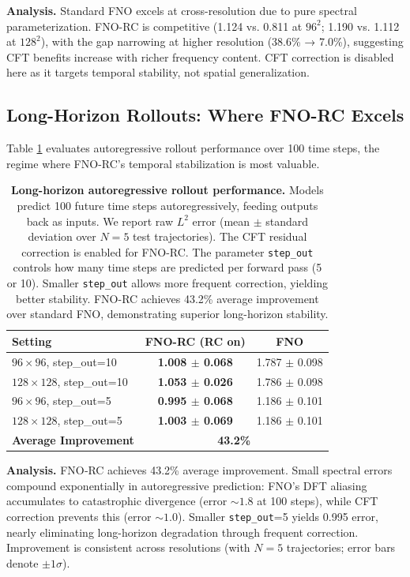 \documentclass[11pt]{article}
\begin{document}
\textbf{Analysis.} Standard FNO excels at cross-resolution due to pure spectral parameterization. FNO-RC is competitive (1.124 vs. 0.811 at $96^2$; 1.190 vs. 1.112 at $128^2$), with the gap narrowing at higher resolution (38.6\% → 7.0\%), suggesting CFT benefits increase with richer frequency content. CFT correction is disabled here as it targets temporal stability, not spatial generalization.

\subsection{Long-Horizon Rollouts: Where FNO-RC Excels}

Table \ref{tab:rollout} evaluates autoregressive rollout performance over 100 time steps, the regime where FNO-RC's temporal stabilization is most valuable.

\begin{table}[h]
\centering
\caption{\textbf{Long-horizon autoregressive rollout performance.} Models predict 100 future time steps autoregressively, feeding outputs back as inputs. We report raw $L^2$ error (mean $\pm$ standard deviation over $N=5$ test trajectories). The CFT residual correction is enabled for FNO-RC. The parameter \texttt{step\_out} controls how many time steps are predicted per forward pass (5 or 10). Smaller \texttt{step\_out} allows more frequent correction, yielding better stability. FNO-RC achieves 43.2\% average improvement over standard FNO, demonstrating superior long-horizon stability.}
\label{tab:rollout}
\small
\begin{tabular}{@{}lcc@{}}
\toprule
\textbf{Setting} & \textbf{FNO-RC (RC on)} & \textbf{FNO} \\
\midrule
$96 \times 96$, step\_out=10 & \textbf{1.008 $\pm$ 0.068} & 1.787 $\pm$ 0.098 \\
$128 \times 128$, step\_out=10 & \textbf{1.053 $\pm$ 0.026} & 1.786 $\pm$ 0.098 \\
$96 \times 96$, step\_out=5 & \textbf{0.995 $\pm$ 0.068} & 1.186 $\pm$ 0.101 \\
$128 \times 128$, step\_out=5 & \textbf{1.003 $\pm$ 0.069} & 1.186 $\pm$ 0.101 \\
\midrule
\textbf{Average Improvement} & \multicolumn{2}{c}{\textbf{43.2\%}} \\
\bottomrule
\end{tabular}
\end{table}

\textbf{Analysis.} FNO‑RC achieves 43.2\% average improvement. Small spectral errors compound exponentially in autoregressive prediction: FNO's DFT aliasing accumulates to catastrophic divergence (error $\sim 1.8$ at 100 steps), while CFT correction prevents this (error $\sim 1.0$). Smaller \texttt{step\_out}=5 yields 0.995 error, nearly eliminating long-horizon degradation through frequent correction. Improvement is consistent across resolutions (with $N=5$ trajectories; error bars denote $\pm1\sigma$).
\end{document}
